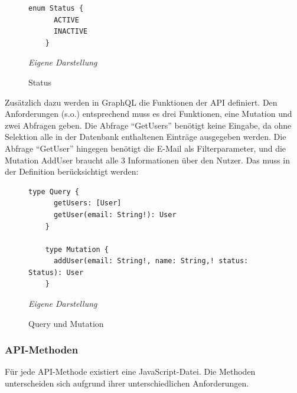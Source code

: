 	\begin{figure}[H]
	\centering
	\begin{minipage}[t]{.7\textwidth} %
	\caption{Status} %
	\begin{lstlisting}[style=graphql]
	enum Status {
	  ACTIVE
	  INACTIVE
	}
	\end{lstlisting}
	\textit{Eigene Darstellung} %
	\label{fig:status}
	\end{minipage}
	\end{figure}

Zusätzlich dazu werden in GraphQL die Funktionen der API definiert. Den Anforderungen (s.o.) entsprechend muss es drei Funktionen, eine Mutation und zwei Abfragen geben. Die Abfrage ``GetUsers'' benötigt keine Eingabe, da ohne Selektion alle in der Datenbank enthaltenen Einträge ausgegeben werden. Die Abfrage ``GetUser'' hingegen benötigt die E-Mail als Filterparameter, und die Mutation AddUser braucht alle 3 Informationen über den Nutzer. Das muss in der Definition berücksichtigt werden:

	\begin{figure}[H]
	\centering
	\begin{minipage}[t]{.7\textwidth} %
	\caption{Query und Mutation} %
	\begin{lstlisting}[style=graphql]
	type Query {
	  getUsers: [User]
	  getUser(email: String!): User
	}
	
	type Mutation {
	  addUser(email: String!, name: String,! status: Status): User
	}
	\end{lstlisting}
	\textit{Eigene Darstellung} %
	\label{fig:queryAndMutation}
	\end{minipage}
	\end{figure}


\subsubsection{API-Methoden}
Für jede API-Methode existiert eine JavaScript-Datei. Die Methoden unterscheiden sich aufgrund ihrer unterschiedlichen Anforderungen.
